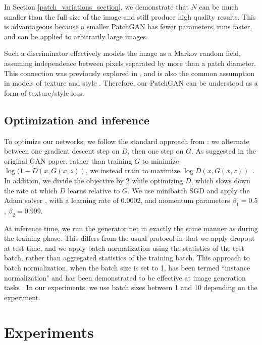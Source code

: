\documentclass[10pt,twocolumn,letterpaper]{article}
\begin{document}
In Section \ref{patch_variations_section}, we demonstrate that $N$ can be much smaller than the full size of the image and still produce high quality results. This is advantageous because a smaller PatchGAN has fewer parameters, runs faster, and can be applied to arbitrarily large images.

Such a discriminator effectively models the image as a Markov random field, assuming independence between pixels separated by more than a patch diameter. This connection was previously explored in \cite{li2016precomputed}, and is also the common assumption in models of texture \cite{efros1999texture,gatys2015texture} and style \cite{efros2001image,hertzmann2001image,gatys2015neural,li2016combining}. Therefore, our PatchGAN can be understood as a form of texture/style loss.


\subsection{Optimization and inference}

To optimize our networks, we follow the standard approach from \cite{goodfellow2014generative}: we alternate between one gradient descent step on $D$, then one step on $G$. As suggested in the original GAN paper, rather than training $G$ to minimize $\log(1-D(x,G(x,z))$, we instead train to maximize $\log D(x,G(x,z))$~\cite{goodfellow2014generative}. In addition, we divide the objective by $2$ while optimizing $D$, which slows down the rate at which $D$ learns relative to $G$. We use minibatch SGD and apply the Adam solver \cite{kingma2014adam}, with a learning rate of $0.0002$, and momentum parameters $\beta_1=0.5$, $\beta_2=0.999$.

At inference time, we run the generator net in exactly the same manner as during the training phase. This differs from the usual protocol in that we apply dropout at test time, and we apply batch normalization \cite{ioffe2015batch} using the statistics of the test batch, rather than aggregated statistics of the training batch. This approach to batch normalization, when the batch size is set to 1, has been termed ``instance normalization" and has been demonstrated to be effective at image generation tasks \cite{ulyanov2016instance}. In our experiments, we use batch sizes between 1 and 10 depending on the experiment.



\section{Experiments}
\end{document}
